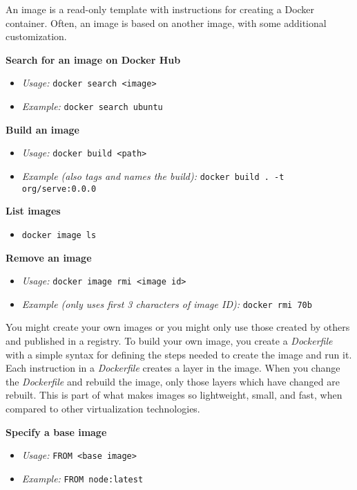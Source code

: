 \documentclass{article}
\begin{document}
An image is a read-only template with instructions for creating a Docker container. Often, an image is based on another image, with some additional customization.

\textbf{Search for an image on Docker Hub}

\begin{itemize}
  \item \textit{Usage:} \texttt{docker search <image>}
  \item \textit{Example:} \texttt{docker search ubuntu}
\end{itemize}

\textbf{Build an image}

\begin{itemize}
  \item \textit{Usage:} \texttt{docker build <path>}
  \item \textit{Example (also tags and names the build):} \texttt{docker build . -t org/serve:0.0.0}
\end{itemize}

\textbf{List images}

\begin{itemize}
  \item \texttt{docker image ls}
\end{itemize}

\textbf{Remove an image}

\begin{itemize}
  \item \textit{Usage:} \texttt{docker image rmi <image id>}
  \item \textit{Example (only uses first 3 characters of image ID):} \texttt{docker rmi 70b}
\end{itemize}

You might create your own images or you might only use those created by others and published in a registry. To build your own image, you create a \textit{Dockerfile} with a simple syntax for defining the steps needed to create the image and run it. Each instruction in a \textit{Dockerfile} creates a layer in the image. When you change the \textit{Dockerfile} and rebuild the image, only those layers which have changed are rebuilt. This is part of what makes images so lightweight, small, and fast, when compared to other virtualization technologies.

\textbf{Specify a base image}

\begin{itemize}
  \item \textit{Usage:} \texttt{FROM <base image>}
  \item \textit{Example:} \texttt{FROM node:latest}
\end{itemize}
\end{document}
